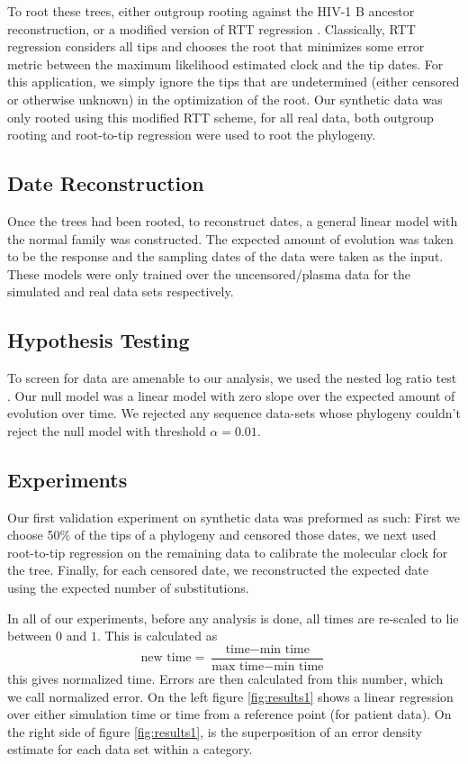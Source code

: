 To root these trees, either outgroup rooting against the HIV-1 B ancestor reconstruction, or a modified version of RTT regression \citep{APE}. 
Classically, RTT regression considers all tips and chooses the root that minimizes some error metric between the maximum likelihood estimated clock and the tip dates. 
For this application, we simply ignore the tips that are undetermined (either censored or otherwise unknown) in the optimization of the root. 
Our synthetic data was only rooted using this modified RTT scheme, for all real data, both outgroup rooting and root-to-tip regression were used to root the phylogeny. 


\subsection{Date Reconstruction} \label{subsec:daterecon}
Once the trees had been rooted, to reconstruct dates, a general linear model with the normal family was constructed. 
The expected amount of evolution was taken to be the response and the sampling dates of the data were taken as the input. 
These models were only trained over the uncensored/plasma data for the simulated and real data sets respectively.

\subsection{Hypothesis Testing} \label{subsec:hypot}
To screen for data are amenable to our analysis, we used the nested log ratio test \citep{Ho14}. 
Our null model was a linear model with zero slope over the expected amount of evolution over time. 
We rejected any sequence data-sets whose phylogeny couldn't reject the null model with threshold $\alpha=0.01$.


\subsection{Experiments} \label{subsec:experiments}
Our first validation experiment on synthetic data was preformed as such: First we choose 50\% of the tips of a phylogeny and censored those dates, we next used root-to-tip regression \citep{APE} on the remaining data to calibrate the molecular clock for the tree. Finally, for each censored date, we reconstructed the expected date using the expected number of substitutions.

In all of our experiments, before any analysis is done, all times are re-scaled to lie between $0$ and $1$. This is calculated as $$ \text{new time} = \frac{\text{time} - \text{min time}}{\text{max time} - \text{min time}}$$ this gives normalized time. Errors are then calculated from this number, which we call normalized error. On the left figure \ref{fig:results1} shows a linear regression over either simulation time or time from a reference point (for patient data). On the right side of figure \ref{fig:results1}, is the superposition of an error density estimate for each data set within a category. 
